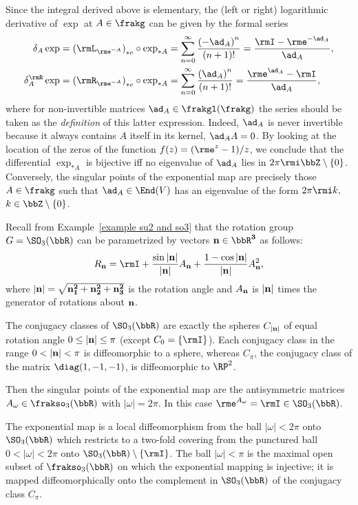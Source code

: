 \begin{rem}
    Since the integral derived above is elementary, the (left or right) logarithmic derivative of $\exp$ at $A\in\frakg$ can be given by the formal series
    \begin{align}
        \delta_A\exp= \left(\rmL_{\rme^{-A}}\right)_{\ast e}\circ \exp_{\ast A}&=\sum_{n=0}^\infty \frac{\left(-\ad_{A}\right)^n}{(n+1)!}=\frac{\rmI-\rme^{-\ad_A}}{\ad_A},\\
        \delta^\rmR_A\exp= \left(\rmR_{\rme^{-A}}\right)_{\ast e}\circ \exp_{\ast A}&=\sum_{n=0}^\infty \frac{\left(\ad_{A}\right)^n}{(n+1)!}=\frac{\rme^{\ad_A}-\rmI}{\ad_A},\label{dexp series}
    \end{align}
    where for non-invertible matrices $\ad_A\in\frakgl(\frakg)$ the series should be taken as the \emph{definition} of this latter expression. Indeed, $\ad_A$ is never invertible because it always contains $A$ itself in its kernel, $\ad_A A=0$. By looking at the location of the zeros of the function $f(z)=(\rme^z-1)/z$, we conclude that the differential $\exp_{\ast A}$ is bijective iff no eigenvalue of $\ad_A$ lies in $2\pi \rmi\bbZ\setminus\{0\}$. Conversely, the singular points of the exponential map are precisely those $A\in \frakg$ such that $\ad_A\in \End(V)$ has an eigenvalue of the form $2\pi \rmi k,$ $k\in\bbZ\setminus\{0\}$.
\end{rem}

\begin{example}
    Recall from Example~\ref{example su2 and so3} that the rotation group $G=\SO_3(\bbR)$ can be parametrized by vectors $\bf{n}\in\bbR^3$ as follows:
    \[R_{\bf{n}}=\rmI+\frac{\sin |\bf{n}|}{|\bf{n}|}A_{\bf{n}}+\frac{1-\cos |\bf{n}|}{|\bf{n}|}A_{\bf{n}}^2,\]
    where $|\bf{n}|=\sqrt{n_1^2+n_2^2+n_3^2}$ is the rotation angle and $A_{\bf n}$ is $|\bf n|$ times the generator of rotations about $\bf n$.

    The conjugacy classes of $\SO_3(\bbR)$ are exactly the spheres $C_{|\bf{n}|}$ of equal rotation angle $0\leq |\bf{n}|\leq \pi$ (except $C_0=\{\rmI\}$). Each conjugacy class in the range $0<|\bf{n}|<\pi$ is diffeomorphic to a sphere, whereas $C_\pi$, the conjugacy class of the matrix $\diag(1,-1,-1)$, is diffeomorphic to $\RP^2$.
    
    Then the singular points of the exponential map are the antisymmetric matrices $A_\omega\in \frakso_3(\bbR)$ with $|\omega|=2\pi$. In this case $\rme^{A_\omega}=\rmI\in \SO_3(\bbR)$. 

    The exponential map is a local diffeomorphism from the ball $|\omega|<2\pi$ onto $\SO_3(\bbR)$ which restricts to a two-fold covering from the punctured ball $0<|\omega|<2\pi$ onto $\SO_3(\bbR)\setminus \{\rmI\}$. The ball $|\omega|<\pi$ is the maximal open subset of $\frakso_3(\bbR)$ on which the exponential mapping is injective; it is mapped diffeomorphically onto the complement in $\SO_3(\bbR)$ of the conjugacy class $C_\pi$.
\end{example}


